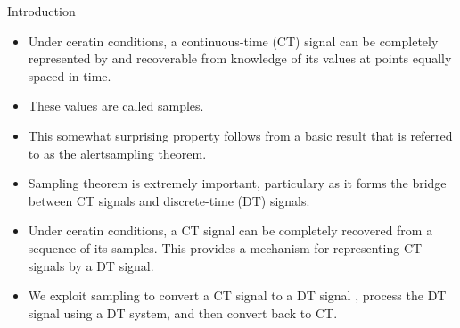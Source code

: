 %
%
%


\begin{frame}{Introduction}
    \begin{itemize}
        \item Under ceratin conditions, a continuous-time (CT) signal can be completely represented by and recoverable from knowledge of its values at points equally spaced in time.
        \item These values are called \alert{samples}.
        \item This somewhat surprising property follows from a basic result that is referred to as the alert{sampling theorem}.
        \item Sampling theorem is extremely important, particulary as it forms the bridge between CT signals and discrete-time (DT) signals.
        \item Under ceratin conditions, a CT signal can be completely recovered from a sequence of its samples. This provides a mechanism for representing CT signals by a DT signal.
        \item We exploit sampling to convert a CT signal to a DT signal , process the DT signal using a DT system, and then convert back to CT.
    \end{itemize}
\end{frame}

